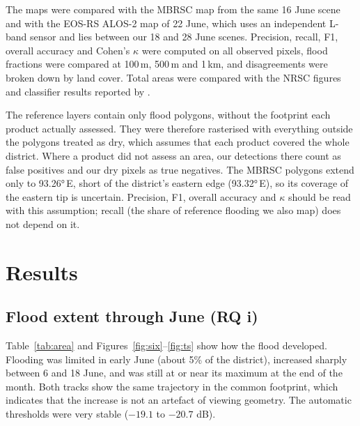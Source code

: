 \documentclass[11pt,a4paper]{article}
\begin{document}
The maps were compared with the MBRSC map from the same 16 June scene and with the EOS-RS ALOS-2 map of
22 June, which uses an independent L-band sensor and lies between our 18 and 28 June scenes. Precision,
recall, F1, overall accuracy and Cohen's $\kappa$ were computed on all observed pixels, flood fractions were
compared at 100\,m, 500\,m and 1\,km, and disagreements were broken down by land cover. Total areas were
compared with the NRSC figures and classifier results reported by \cite{irukumati}.

The reference layers contain only flood polygons, without the footprint each product actually assessed. They were
therefore rasterised with everything outside the polygons treated as dry, which assumes that each product covered the
whole district. Where a product did not assess an area, our detections there count as false positives and our dry
pixels as true negatives. The MBRSC polygons extend only to \ang{93.26}\,E, short of the district's eastern edge
(\ang{93.32}\,E), so its coverage of the eastern tip is uncertain. Precision, F1, overall accuracy and $\kappa$ should
be read with this assumption; recall (the share of reference flooding we also map) does not depend on it.

\section{Results}
\subsection{Flood extent through June (RQ i)}
Table~\ref{tab:area} and Figures~\ref{fig:six}--\ref{fig:ts} show how the flood developed. Flooding was limited in
early June (about 5\% of the district), increased sharply between 6 and 18 June, and was still at or near its
maximum at the end of the month. Both tracks show the same trajectory in the common footprint, which indicates
that the increase is not an artefact of viewing geometry. The automatic thresholds were very stable
($-19.1$ to $-20.7$ dB).
\end{document}
